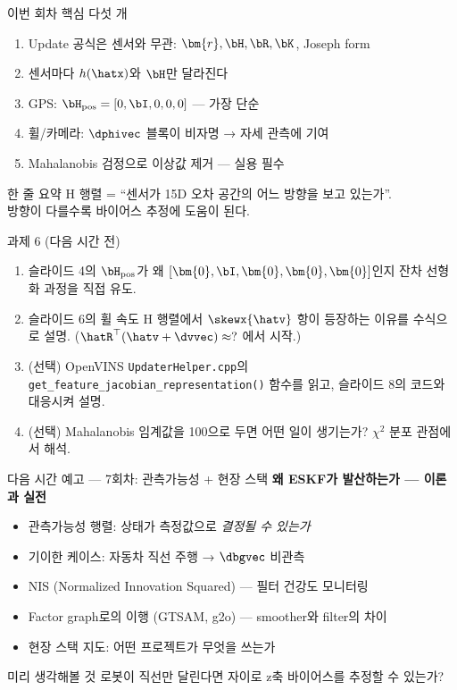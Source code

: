 \begin{frame}{이번 회차 핵심 다섯 개}
  \begin{enumerate}
    \item Update 공식은 센서와 무관: $\bm{r}, \bH, \bR, \bK$, Joseph form
    \item 센서마다 $h(\hatx)$와 $\bH$만 달라진다
    \item GPS: $\bH_\text{pos} = [0,\bI,0,0,0]$ — 가장 단순
    \item 휠/카메라: $\dphivec$ 블록이 비자명 → 자세 관측에 기여
    \item Mahalanobis 검정으로 이상값 제거 — 실용 필수
  \end{enumerate}
  \vspace{0.3em}
  \begin{block}{한 줄 요약}
    H 행렬 = ``센서가 15D 오차 공간의 어느 방향을 보고 있는가''.\\
    방향이 다를수록 바이어스 추정에 도움이 된다.
  \end{block}
\end{frame}

\begin{frame}{과제 6 (다음 시간 전)}
  \begin{enumerate}
    \item 슬라이드 4의 $\bH_\text{pos}$가 왜 $[\bm{0},\bI,\bm{0},\bm{0},\bm{0}]$인지 잔차 선형화 과정을 직접 유도.
    \item 슬라이드 6의 휠 속도 H 행렬에서 $\skewx{\hatv}$ 항이 등장하는 이유를 수식으로 설명.
          ($\hatR^\top(\hatv+\dvvec) \approx ?$ 에서 시작.)
    \item (선택) OpenVINS \texttt{UpdaterHelper.cpp}의 \texttt{get\_feature\_jacobian\_representation()}
          함수를 읽고, 슬라이드 8의 코드와 대응시켜 설명.
    \item (선택) Mahalanobis 임계값을 100으로 두면 어떤 일이 생기는가? $\chi^2$ 분포 관점에서 해석.
  \end{enumerate}
\end{frame}

\begin{frame}{다음 시간 예고 — 7회차: 관측가능성 + 현장 스택}
  \textbf{왜 ESKF가 발산하는가 — 이론과 실전}
  \begin{itemize}
    \item 관측가능성 행렬: 상태가 측정값으로 \emph{결정될 수 있는가}
    \item 기이한 케이스: 자동차 직선 주행 → $\dbgvec$ 비관측
    \item NIS (Normalized Innovation Squared) — 필터 건강도 모니터링
    \item Factor graph로의 이행 (GTSAM, g2o) — smoother와 filter의 차이
    \item 현장 스택 지도: 어떤 프로젝트가 무엇을 쓰는가
  \end{itemize}
  \vspace{0.3em}
  \begin{block}{미리 생각해볼 것}
    로봇이 직선만 달린다면 자이로 z축 바이어스를 추정할 수 있는가?
  \end{block}
\end{frame}

